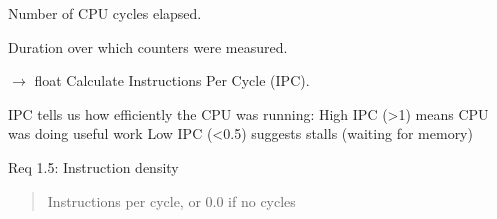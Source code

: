 \documentclass[letterpaper,10pt,english]{sphinxmanual}
\begin{document}
\begin{fulllineitems}
\begin{fulllineitems}
\label{\detokenize{core.models.performance_counters:core.models.performance_counters.PerformanceCounters.cpu_cycles}}
\pysigstartsignatures
\pysigline
{}
\pysigstopsignatures
\sphinxAtStartPar
Number of CPU cycles elapsed.

\end{fulllineitems}


\begin{fulllineitems}
\label{\detokenize{core.models.performance_counters:core.models.performance_counters.PerformanceCounters.duration_ms}}
\pysigstartsignatures
\pysigline
{}
\pysigstopsignatures
\sphinxAtStartPar
Duration over which counters were measured.

\end{fulllineitems}


\begin{fulllineitems}
\label{\detokenize{core.models.performance_counters:core.models.performance_counters.PerformanceCounters.instructions_per_cycle}}
\pysigstartsignatures
\pysiglinewithargsret
{}
{}
{{ $\rightarrow$ float}}
\pysigstopsignatures
\sphinxAtStartPar
Calculate Instructions Per Cycle (IPC).

\sphinxAtStartPar
IPC tells us how efficiently the CPU was running:
\sphinxhyphen{} High IPC (\textgreater{}1) means CPU was doing useful work
\sphinxhyphen{} Low IPC (\textless{}0.5) suggests stalls (waiting for memory)

\sphinxAtStartPar
Req 1.5: Instruction density
\begin{quote}\begin{description}
\sphinxAtStartPar
Instructions per cycle, or 0.0 if no cycles


\end{description}
\end{quote}
\end{fulllineitems}
\end{fulllineitems}
\end{document}
